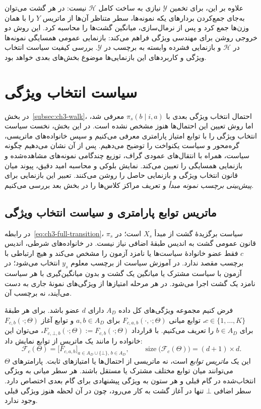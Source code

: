 علاوه بر این، برای تخمین $\mathscr Y$ نیازی به ساخت کامل $\mathscr H$ نیست: در هر گشت می‌توان به‌جای جمع‌کردن بردارهای یکه نمونه‌ها، سطر متناظر آن‌ها از ماتریس $Y$ را با همان وزن‌ها جمع کرد و پس از نرمال‌سازی، میانگین گشت‌ها را محاسبه کرد. این روش دو خروجی روشن برای مهندسی ویژگی فراهم می‌کند: بازنمایی عمومی همسایگی نمونه‌ها در $\mathscr H$ و بازنمایی فشرده وابسته به برچسب در $\mathscr Y$. بررسی کیفیت سیاست انتخاب ویژگی و کاربردهای این بازنمایی‌ها موضوع بخش‌های بعدی خواهد بود.

\section{سیاست انتخاب ویژگی}
\label{sec:ch3-feature-selection-policy}
در بخش~\ref{subsec:ch3-walk}، احتمال انتخاب ویژگی بعدی با
$\pi_s(b\mid i,a)$ معرفی شد، اما روش تعیین این احتمال‌ها هنوز مشخص نشده است.
در این بخش، نخست سیاست انتخاب ویژگی را با توابع امتیاز پارامتری
معرفی می‌کنیم و سپس خانواده‌های ماتریسی، گره‌محور و سیاست یکنواخت را
توضیح می‌دهیم. پس از آن نشان می‌دهیم چگونه سیاست، همراه با انتقال‌های عمودی گراف،
توزیع چندگامی نمونه‌های مشاهده‌شده و بازنمایی همسایگی را تعیین می‌کند.
نمایش بلوکی و محاسبه امید دقیق، پیوند میان قانون انتخاب ویژگی
و بازنمایی حاصل را روشن می‌کنند.
تعبیر این بازنمایی برای \emph{پیش‌بینی برچسب نمونه مبدأ}
و تعریف مراکز کلاس‌ها را در بخش بعد بررسی می‌کنیم.

\subsection{ماتریس توابع پارامتری و سیاست انتخاب ویژگی}
\label{subsec:ch3-parametric-feature-policy}
در رابطه~\eqref{eq:ch3-full-transition}،
$\pi_s$ سیاست برگزیدهٔ گشت از مبدأ $X_s$ است؛
در قانون عمومی گشت به اندیس طبقهٔ اضافی
نیاز نیست. در خانواده‌های شرطی، اندیس $c$
فقط عضو خانوادهٔ سیاست‌ها یا نامزد آزمون
را مشخص می‌کند و هیچ ارتباطی با برچسب
مقصد ندارد. در آموزش سیاست از برچسب معلوم
$y_s$ انتخاب می‌شود؛ در آزمون با سیاست
مشترک یا میانگین یک گشت و بدون میانگین‌گیری
با هر سیاست نامزد یک گشت اجرا می‌شود.
در هر مرحله امتیازها از ویژگی‌های نمونهٔ
جاری به دست می‌آیند، نه برچسب آن.

فرض کنیم مجموعه ویژگی‌های کل داده $A_D$ دارای $d$ عضو باشد.
برای هر طبقهٔ $c\in\{1,\ldots,K\}$، توابع میانی $F_{c,a,b}(\cdot,\cdot;\Theta)$ برای
$a,b\in A_D$ و توابع آغاز $F_{c,b}(\cdot;\Theta)$ برای $b\in A_D$
را تعریف می‌کنیم. با قرارداد $F_{c,\bot,b}(\cdot;\Theta):=F_{c,b}(\cdot;\Theta)$،
می‌توان این خانواده را مانند یک ماتریس از توابع نمایش داد:
\begin{equation}\label{eq:ch3-parametric-score-matrix}
\boxed{
\mathcal F_{c}(\Theta)=
\bigl[F_{c,a,b}\bigr]_{a\in A_D\cup\{\bot\},\,b\in A_D},
\qquad
\operatorname{size}\bigl(\mathcal F_{c}(\Theta)\bigr)=(d+1)\times d.
}
\end{equation}
این یک \emph{ماتریس توابع} است، نه ماتریسی از احتمال‌ها یا امتیازهای
ثابت. پارامترهای $\Theta$ می‌توانند میان توابع مختلف مشترک یا مستقل باشند.
هر سطر میانی به ویژگی انتخاب‌شده در گام قبلی و هر ستون به ویژگی پیشنهادی
برای گام بعدی اختصاص دارد. سطر اضافی $\bot$ تنها در آغاز گشت به کار می‌رود،
چون در آن لحظه هنوز ویژگی قبلی وجود ندارد.

